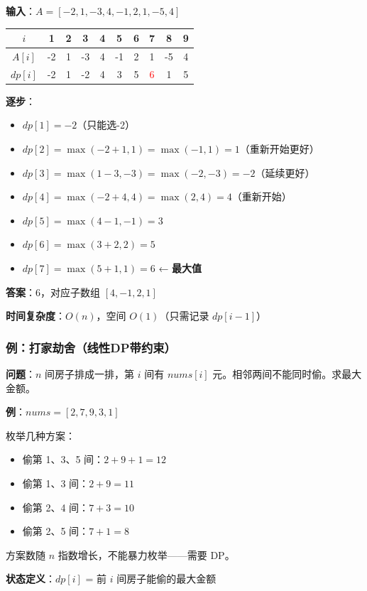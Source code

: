 \documentclass[12pt, a4paper]{ctexart}
\begin{document}
\begin{blackboard}

\textbf{输入}：$A = [-2, 1, -3, 4, -1, 2, 1, -5, 4]$

\begin{center}
\begin{tabular}{c|ccccccccc}
$i$ & 1 & 2 & 3 & 4 & 5 & 6 & 7 & 8 & 9 \\
\hline
$A[i]$ & -2 & 1 & -3 & 4 & -1 & 2 & 1 & -5 & 4 \\
$dp[i]$ & -2 & 1 & -2 & 4 & 3 & 5 & \textcolor{red}{6} & 1 & 5 \\
\end{tabular}
\end{center}

\textbf{逐步}：
\begin{itemize}
    \item $dp[1] = -2$（只能选-2）
    \item $dp[2] = \max(-2+1, 1) = \max(-1, 1) = 1$（重新开始更好）
    \item $dp[3] = \max(1-3, -3) = \max(-2, -3) = -2$（延续更好）
    \item $dp[4] = \max(-2+4, 4) = \max(2, 4) = 4$（重新开始）
    \item $dp[5] = \max(4-1, -1) = 3$
    \item $dp[6] = \max(3+2, 2) = 5$
    \item $dp[7] = \max(5+1, 1) = 6$ ← \textbf{最大值}
\end{itemize}

\textbf{答案}：6，对应子数组 $[4, -1, 2, 1]$

\textbf{时间复杂度}：$O(n)$，空间 $O(1)$（只需记录 $dp[i-1]$）

\end{blackboard}

\subsubsection{例：打家劫舍（线性DP带约束）}

\begin{blackboard}

\textbf{问题}：$n$ 间房子排成一排，第 $i$ 间有 $nums[i]$ 元。相邻两间不能同时偷。求最大金额。

\textbf{例}：$nums = [2, 7, 9, 3, 1]$

枚举几种方案：
\begin{itemize}
    \item 偷第 1、3、5 间：$2 + 9 + 1 = 12$
    \item 偷第 1、3 间：$2 + 9 = 11$
    \item 偷第 2、4 间：$7 + 3 = 10$
    \item 偷第 2、5 间：$7 + 1 = 8$
\end{itemize}

方案数随 $n$ 指数增长，不能暴力枚举——需要 DP。

\textbf{状态定义}：$dp[i]$ = 前 $i$ 间房子能偷的最大金额

\end{blackboard}
\end{document}
